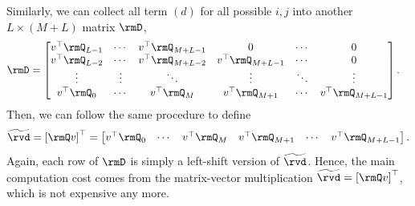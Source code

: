 Similarly, we can collect all term $(d)$ for all possible $i, j$ into another $L \times (M+L)$ matrix $\rmD$,
\begin{align*}
	\rmD &=
	\begin{bmatrix}
	v^\top \rmQ_{L-1} & \cdots & v^\top \rmQ_{M+L-1} & 0 & \cdots & 0 \\
	v^\top \rmQ_{L-2} & \cdots & v^\top \rmQ_{M+L-2} & v^\top \rmQ_{M+L-1} & \cdots & 0 \\
	\vdots            & \vdots & \ddots              & \vdots              & \ddots & \vdots     \\
	v^\top \rmQ_{0}   & \cdots & v^\top \rmQ_{M}     & v^\top \rmQ_{M+1}   & \cdots & v^\top \rmQ_{M+L-1} \\
	\end{bmatrix}.
\end{align*}
Then, we can follow the same procedure to define
\[
\widetilde{\rvd} = \left[\rmQ v \right]^\top
	=
	\begin{bmatrix}
	v^\top \rmQ_{0}   & \cdots & v^\top \rmQ_{M}     & v^\top \rmQ_{M+1}   & \cdots & v^\top \rmQ_{M+L-1}
	\end{bmatrix}.
\]
Again, each row of $\rmD$ is simply a left-shift version of $\widetilde{\rvd}$.
Hence, the main computation cost comes from the matrix-vector multiplication $\widetilde{\rvd} = \left[\rmQ v \right]^\top$, which is not expensive any more.

